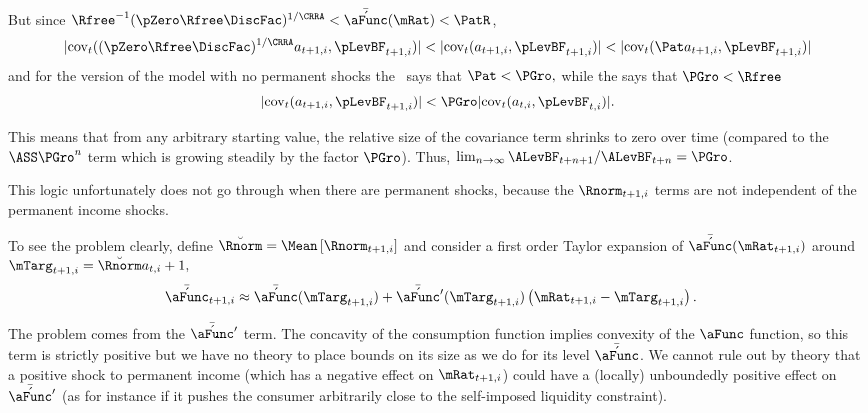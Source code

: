 \documentclass[\econtexRoot/BufferStockTheory]{subfiles}
\begin{document}
But since ${\Rfree}^{-1}(\pZero  \Rfree\DiscFac)^{1/\CRRA} < \AMPS(\mRat) < \PatR $,
\begin{equation}
  |\mbox{cov}_{t}((\pZero  \Rfree\DiscFac)^{1/\CRRA}a_{t+1,i},\pLevBF_{t+1,i})| <
  |\mbox{cov}_{t}(a_{t+1,i},\pLevBF_{t+1,i})| <
  |\mbox{cov}_{t}({\Pat}a_{t+1,i},\pLevBF_{t+1,i})| \nonumber
\end{equation}
and for the version of the model with no permanent shocks the \GIC~says that
${\Pat} < \PGro, $ while the {\FHWC} says that $\PGro < \Rfree$
\begin{equation}\begin{gathered}\begin{aligned}
  |\mbox{cov}_{t}(a_{t+1,i},\pLevBF_{t+1,i})| < \PGro
  |\mbox{cov}_{t}(a_{t,i},\pLevBF_{t,i})|. \nonumber
\end{aligned}\end{gathered}\end{equation}

This means that from any arbitrary starting value, the relative
size of the covariance term shrinks to zero over time (compared
to the $\ASS \PGro^{n}$ term which is growing steadily
by the factor $\PGro$).  Thus, $\lim_{n \rightarrow \infty} \ALevBF_{t+n+1}/\ALevBF_{t+n} = \PGro$.

This logic unfortunately does not go through when there are permanent
shocks, because the $\Rnorm _{t+1,i}$ terms are not independent
of the permanent income shocks.

To see the problem clearly, define $\breve{\Rnorm }=\Mean\left[\Rnorm _{t+1,i}\right]$ and consider a first order Taylor expansion of $\AMPS(\mRat_{t+1,i})$ around $\mTarg_{t+1,i}=\breve{\Rnorm } a_{t,i}+1,$
\begin{align*}
  \AMPS_{t+1,i} & \approx 
  \AMPS(\mTarg_{t+1,i})+\AMPS^{\prime}(\mTarg_{t+1,i})\left(\mRat_{t+1,i}-\mTarg_{t+1,i}\right)
 \nonumber.
\end{align*}

The problem comes from the $\AMPS^{\prime}$ term.  The
concavity of the consumption function implies convexity of the
$\aFunc$ function, so this term is strictly positive but we have no
theory to place bounds on its size as we do for its level $\AMPS$.
We cannot rule out by theory that a positive shock to permanent income (which has a
negative effect on $\mRat_{t+1,i}$) could have a (locally) unboundedly positive
effect on $\AMPS^{\prime}$ (as for instance if it pushes the
consumer arbitrarily close to the self-imposed liquidity constraint).
\end{document}
